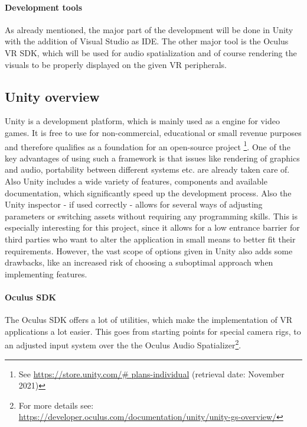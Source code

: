 \documentclass[a4paper,11pt]{article}%
\renewcommand{\\}{\vspace*{0.5\baselineskip} \newline}
\begin{document}
\paragraph{Development tools} As already mentioned, the major part of the development will be done in Unity with the addition of Visual Studio as \ac{IDE}. The other major tool is the Oculus \ac{VR} \ac{SDK}, which will be used for audio spatialization and of course rendering the visuals to be properly displayed on the given \ac{VR} peripherals.


\subsection{Unity overview}
\label{sec:unity}
Unity is a development platform, which is mainly used as a engine for video games. It is free to use for non-commercial, educational or small revenue purposes and therefore qualifies as a foundation for an open-source project \footnote{See \url{https://store.unity.com/\# plans-individual} (retrieval date: November 2021)}. One of the key advantages of using such a framework is that issues like rendering of graphics and audio, portability between different systems etc. are already taken care of. Also Unity includes a wide variety of features, components and available documentation, which significantly speed up the development process. Also the Unity inspector - if used correctly - allows for several ways of adjusting parameters or switching assets without requiring any programming skills. This is especially interesting for this project, since it allows for a low entrance barrier for third parties who want to alter the application in small means to better fit their requirements. However, the vast scope of options given in Unity also adds some drawbacks, like an increased risk of choosing a suboptimal approach when implementing features.

\paragraph{Oculus SDK} The Oculus \acs{SDK} offers a lot of utilities, which make the implementation of  \ac{VR} applications a lot easier. This goes from starting points for special camera rigs, to an adjusted input system over the the Oculus Audio Spatializer\footnote{For more details see: \url{https://developer.oculus.com/documentation/unity/unity-gs-overview/}}.
\end{document}
